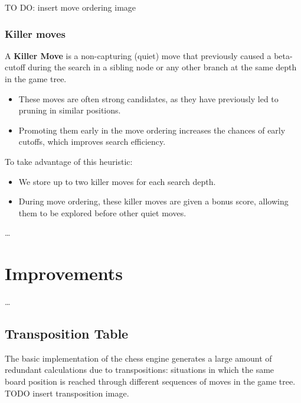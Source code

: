 TO DO: insert move ordering image\\

\subsubsection{Killer moves}

A \textbf{Killer Move} is a non-capturing (quiet) move that previously caused a beta-cutoff during the search in a sibling node or any other branch at the same depth in the game tree.

\begin{itemize}
  \item These moves are often strong candidates, as they have previously led to pruning in similar positions.
  \item Promoting them early in the move ordering increases the chances of early cutoffs, which improves search efficiency.
\end{itemize}

To take advantage of this heuristic:
\begin{itemize}
  \item We store up to two killer moves for each search depth.
  \item During move ordering, these killer moves are given a bonus score, allowing them to be explored before other quiet moves.
\end{itemize}

\ldots

\section{Improvements}

\ldots

\subsection{Transposition Table}

The basic implementation of the chess engine generates a large amount of\\
redundant calculations due to transpositions: situations in which the same\\
board position is reached through different sequences of moves in the game tree.\\

TODO insert transposition image.\\

